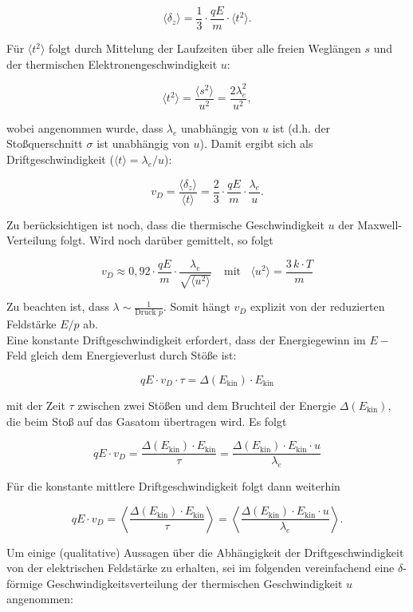 \[ \langle \delta_z \rangle = \frac{1}{3}\cdot \frac{qE}{m}\cdot \langle t^2 \rangle. \]

Für $\langle t^2 \rangle$ folgt durch Mittelung der Laufzeiten über alle freien Weglängen $s$
und der thermischen Elektronengeschwindigkeit $u$:

\[ \langle t^2 \rangle = \frac{\langle s^2 \rangle}{u^2} = \frac{2\lambda_e^2}{u^2} ,\]

wobei angenommen wurde, dass $\lambda_e$ unabhängig von $u$ ist (d.h. der Stoßquerschnitt $\sigma$
ist unabhängig von $u$). Damit ergibt sich als Driftgeschwindigkeit ($\langle t
\rangle=\lambda_e/u$):

\[v_D = \frac{\langle \delta_z \rangle}{\langle t\rangle} = \frac{2}{3}\cdot \frac{qE}{m}\cdot
\frac{\lambda_e}{u}.\]

Zu berücksichtigen ist noch, dass die thermische Geschwindigkeit $u$ der Maxwell-Verteilung folgt.
Wird noch darüber gemittelt, so folgt

\[v_D\approx 0{,}92\cdot \frac{qE}{m}\cdot \frac{\lambda_e}{\sqrt{\langle
u^2\rangle}}~~~~~\text{mit}~~~~ \langle u^2\rangle = \frac{3\,k\cdot T}{m}\]

Zu beachten ist, dass $\lambda\sim \frac{1}{\text{Druck }p}$. Somit hängt $v_D$ explizit von der
reduzierten Feldstärke $E/p$ ab.
\\
Eine konstante Driftgeschwindigkeit erfordert, dass der Energiegewinn im $E-$Feld gleich
dem Energieverlust durch Stöße ist:

\[qE\cdot v_D\cdot \tau = \Delta(E_\text{kin})\cdot E_\text{kin}  \]

mit der Zeit $\tau$ zwischen zwei Stößen und dem Bruchteil der Energie $\Delta(E_\text{kin})$, die
beim Stoß auf das Gasatom übertragen wird. Es folgt

\[qE\cdot v_D = \frac{\Delta(E_\text{kin})\cdot E_\text{kin}}{\tau} =
\frac{\Delta(E_\text{kin})\cdot E_\text{kin}\cdot u}{\lambda_e}  \]

Für die konstante mittlere Driftgeschwindigkeit folgt dann weiterhin

\[qE\cdot v_D = \left\langle \frac{\Delta(E_\text{kin})\cdot E_\text{kin}}{\tau} \right\rangle =
\left\langle \frac{\Delta(E_\text{kin})\cdot E_\text{kin}\cdot u}{\lambda_e}\right\rangle .\]

Um einige (qualitative) Aussagen über die Abhängigkeit der Driftgeschwindigkeit von der
elektrischen Feldstärke zu erhalten, sei im folgenden vereinfachend eine $\delta$-förmige
Geschwindigkeitsverteilung der thermischen Geschwindigkeit $u$ angenommen:

